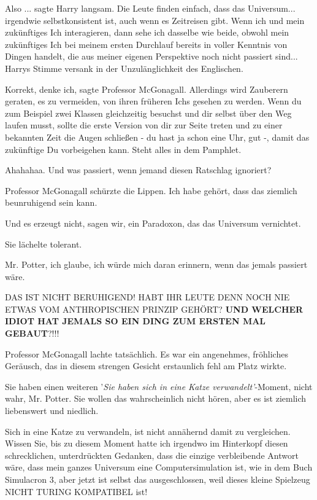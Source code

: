 \glqq Also ...\grqq{} sagte Harry langsam. \glqq Die Leute finden einfach, dass
das Universum... irgendwie selbstkonsistent ist, auch wenn es Zeitreisen gibt.
Wenn ich und mein zukünftiges Ich interagieren, dann sehe ich dasselbe wie
beide, obwohl mein zukünftiges Ich bei meinem ersten Durchlauf bereits in voller
Kenntnis von Dingen handelt, die aus meiner eigenen Perspektive noch nicht
passiert sind...\grqq{} Harrys Stimme versank in der Unzulänglichkeit des
Englischen.

\glqq Korrekt, denke ich\grqq{}, sagte Professor McGonagall. \glqq Allerdings
wird Zauberern geraten, es zu vermeiden, von ihren früheren Ichs gesehen zu
werden. Wenn du zum Beispiel zwei Klassen gleichzeitig besuchst und dir selbst
über den Weg laufen musst, sollte die erste Version von dir zur Seite treten und
zu einer bekannten Zeit die Augen schließen - du hast ja schon eine Uhr, gut -,
damit das zukünftige Du vorbeigehen kann. Steht alles in dem Pamphlet.\grqq{}

\glqq Ahahahaa. Und was passiert, wenn jemand diesen Ratschlag ignoriert?\grqq{}

Professor McGonagall schürzte die Lippen. \glqq Ich habe gehört, dass das
ziemlich beunruhigend sein kann.\grqq{}

\glqq Und es erzeugt nicht, sagen wir, ein Paradoxon, das das Universum
vernichtet.\grqq{}

Sie lächelte tolerant.

\glqq Mr. Potter, ich glaube, ich würde mich daran erinnern, wenn das jemals
passiert wäre.\grqq{}

\glqq DAS IST NICHT BERUHIGEND! HABT IHR LEUTE DENN NOCH NIE ETWAS VOM
ANTHROPISCHEN PRINZIP GEHÖRT? \textbf{UND WELCHER IDIOT HAT JEMALS SO EIN DING
ZUM ERSTEN MAL GEBAUT}?!!!\grqq{}

Professor McGonagall lachte tatsächlich. Es war ein angenehmes, fröhliches
Geräusch, das in diesem strengen Gesicht erstaunlich fehl am Platz wirkte.

\glqq Sie haben einen weiteren '\emph{Sie haben sich in eine Katze
verwandelt'}-Moment, nicht wahr, Mr. Potter. Sie wollen das wahrscheinlich nicht
hören, aber es ist ziemlich liebenswert und niedlich.\grqq{}

\glqq Sich in eine Katze zu verwandeln, ist nicht annähernd damit zu
vergleichen. Wissen Sie, bis zu diesem Moment hatte ich irgendwo im Hinterkopf
diesen schrecklichen, unterdrückten Gedanken, dass die einzige verbleibende
Antwort wäre, dass mein ganzes Universum eine Computersimulation ist, wie in dem
Buch Simulacron 3, aber jetzt ist selbst das ausgeschlossen, weil dieses kleine
Spielzeug NICHT TURING KOMPATIBEL ist!

